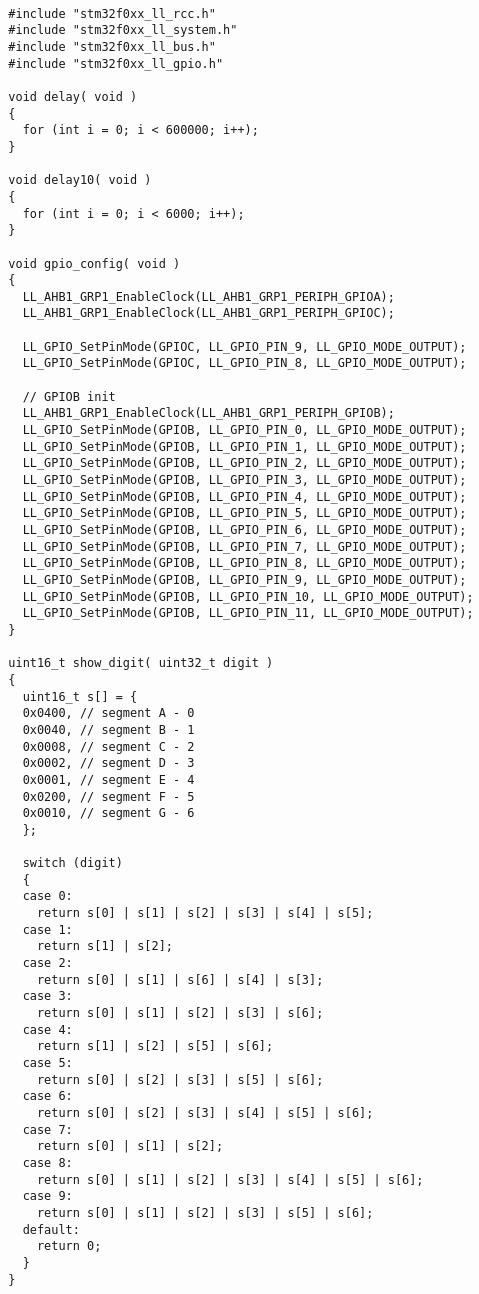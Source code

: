 \begin{verbatim}
    
  #include "stm32f0xx_ll_rcc.h"
  #include "stm32f0xx_ll_system.h"
  #include "stm32f0xx_ll_bus.h"
  #include "stm32f0xx_ll_gpio.h"
  
  void delay( void )
  {
    for (int i = 0; i < 600000; i++);
  }
  
  void delay10( void )
  {
    for (int i = 0; i < 6000; i++);
  }
  
  void gpio_config( void )
  {
    LL_AHB1_GRP1_EnableClock(LL_AHB1_GRP1_PERIPH_GPIOA);
    LL_AHB1_GRP1_EnableClock(LL_AHB1_GRP1_PERIPH_GPIOC);
    
    LL_GPIO_SetPinMode(GPIOC, LL_GPIO_PIN_9, LL_GPIO_MODE_OUTPUT);
    LL_GPIO_SetPinMode(GPIOC, LL_GPIO_PIN_8, LL_GPIO_MODE_OUTPUT);
    
    // GPIOB init
    LL_AHB1_GRP1_EnableClock(LL_AHB1_GRP1_PERIPH_GPIOB);
    LL_GPIO_SetPinMode(GPIOB, LL_GPIO_PIN_0, LL_GPIO_MODE_OUTPUT);
    LL_GPIO_SetPinMode(GPIOB, LL_GPIO_PIN_1, LL_GPIO_MODE_OUTPUT);
    LL_GPIO_SetPinMode(GPIOB, LL_GPIO_PIN_2, LL_GPIO_MODE_OUTPUT);
    LL_GPIO_SetPinMode(GPIOB, LL_GPIO_PIN_3, LL_GPIO_MODE_OUTPUT);
    LL_GPIO_SetPinMode(GPIOB, LL_GPIO_PIN_4, LL_GPIO_MODE_OUTPUT);
    LL_GPIO_SetPinMode(GPIOB, LL_GPIO_PIN_5, LL_GPIO_MODE_OUTPUT);
    LL_GPIO_SetPinMode(GPIOB, LL_GPIO_PIN_6, LL_GPIO_MODE_OUTPUT);
    LL_GPIO_SetPinMode(GPIOB, LL_GPIO_PIN_7, LL_GPIO_MODE_OUTPUT);
    LL_GPIO_SetPinMode(GPIOB, LL_GPIO_PIN_8, LL_GPIO_MODE_OUTPUT);
    LL_GPIO_SetPinMode(GPIOB, LL_GPIO_PIN_9, LL_GPIO_MODE_OUTPUT);
    LL_GPIO_SetPinMode(GPIOB, LL_GPIO_PIN_10, LL_GPIO_MODE_OUTPUT);
    LL_GPIO_SetPinMode(GPIOB, LL_GPIO_PIN_11, LL_GPIO_MODE_OUTPUT);
  }
  
  uint16_t show_digit( uint32_t digit )
  {
    uint16_t s[] = {
    0x0400, // segment A - 0
    0x0040, // segment B - 1
    0x0008, // segment C - 2
    0x0002, // segment D - 3
    0x0001, // segment E - 4
    0x0200, // segment F - 5
    0x0010, // segment G - 6
    };
    
    switch (digit)
    {
    case 0:
      return s[0] | s[1] | s[2] | s[3] | s[4] | s[5];
    case 1:
      return s[1] | s[2];
    case 2:
      return s[0] | s[1] | s[6] | s[4] | s[3];
    case 3:
      return s[0] | s[1] | s[2] | s[3] | s[6];
    case 4:
      return s[1] | s[2] | s[5] | s[6];
    case 5:
      return s[0] | s[2] | s[3] | s[5] | s[6];
    case 6:
      return s[0] | s[2] | s[3] | s[4] | s[5] | s[6];
    case 7:
      return s[0] | s[1] | s[2];
    case 8:
      return s[0] | s[1] | s[2] | s[3] | s[4] | s[5] | s[6];
    case 9:
      return s[0] | s[1] | s[2] | s[3] | s[5] | s[6];
    default:
      return 0;
    }
  }
  

\end{verbatim}
